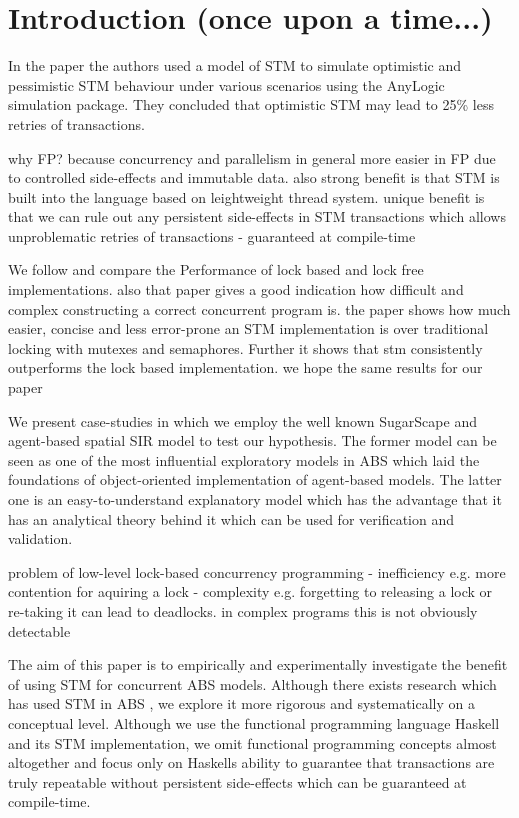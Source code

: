 \section{Introduction (once upon a time...)}
In the paper \cite{heindl_modeling_2009} the authors used a model of STM to simulate optimistic and pessimistic STM behaviour under various scenarios using the AnyLogic simulation package. They concluded that optimistic STM may lead to 25\% less retries of transactions.

why FP? because concurrency and parallelism in general more easier in FP due to controlled side-effects and immutable data. also strong benefit is that STM is built into the language based on leightweight thread system. unique benefit is that we can rule out any persistent side-effects in STM transactions which allows unproblematic retries of transactions - guaranteed at compile-time

We follow \cite{discolo_lock_2006} and compare the Performance of lock based and lock free implementations. also that paper gives a good indication how difficult and complex constructing a correct concurrent program is. the paper shows how much easier, concise and less error-prone an STM implementation is over traditional locking with mutexes and semaphores. Further it shows that stm consistently outperforms the lock based implementation. we hope the same results for our paper

We present case-studies in which we employ the well known SugarScape \citep{epstein_growing_1996} and agent-based spatial SIR \citep{macal_agent-based_2010} model to test our hypothesis. The former model can be seen as one of the most influential exploratory models in ABS which laid the foundations of object-oriented implementation of agent-based models. The latter one is an easy-to-understand explanatory model which has the advantage that it has an analytical theory behind it which can be used for verification and validation. 

problem of low-level lock-based concurrency programming
- inefficiency e.g. more contention for aquiring a lock
- complexity e.g. forgetting to releasing a lock or re-taking it can lead to deadlocks. in complex programs this is not obviously detectable

The aim of this paper is to empirically and experimentally investigate the benefit of using STM for concurrent ABS models. Although there exists research which has used STM in ABS \cite{bezirgiannis_improving_2013}, we explore it more rigorous and systematically on a conceptual level. Although we use the functional programming language Haskell and its STM implementation, we omit functional programming concepts almost altogether and focus only on Haskells ability to guarantee that transactions are truly repeatable without persistent side-effects which can be guaranteed at compile-time.

